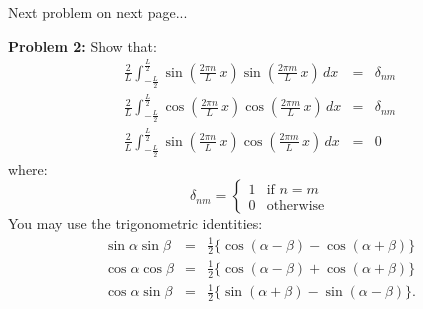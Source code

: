 \documentclass[12pt]{article}
\begin{document}
\vskip 1cm
\begin{center}
Next problem on next page...
\end{center}

\newpage
\noindent
{\bf Problem 2:}  Show that:
\begin{eqnarray*}
\frac{2}{L} \int_{-\frac{L}{2}}^{\frac{L}{2}} 
\sin\left(\frac{2\pi n}{L} \, x \right) \sin\left(\frac{2\pi m}{L} \, x \right) \, dx &=& \delta_{nm} \label{eqn:trigortha} \\
 \frac{2}{L} \int_{-\frac{L}{2}}^{\frac{L}{2}} 
\cos\left(\frac{2\pi n}{L} \, x \right) \cos\left(\frac{2\pi m}{L} \, x \right) \, dx &=& \delta_{nm} \label{eqn:trigorthb}\\
\frac{2}{L} \int_{-\frac{L}{2}}^{\frac{L}{2}} 
\sin\left(\frac{2\pi n}{L} \, x \right) \cos\left(\frac{2\pi m}{L} \, x \right) \, dx &=& 0 \label{eqn:trigorthc}
\end{eqnarray*}
where:
\begin{displaymath}
\delta_{nm} =  
\left\{
        \begin{array}{ll}
                1  & \mbox{if } n=m \\
                0 & \mbox{otherwise}
        \end{array}
\right.
\end{displaymath}
You may use the trigonometric identities:
\begin{eqnarray*}
\sin \alpha \sin \beta &=& \frac{1}{2} \{\cos(\alpha - \beta) - \cos(\alpha + \beta)\}\\
\cos \alpha \cos \beta &=& \frac{1}{2} \{\cos(\alpha - \beta) + \cos(\alpha + \beta)\}\\
\cos \alpha \sin \beta &=& \frac{1}{2} \{\sin(\alpha + \beta) - \sin(\alpha - \beta)\}.\\
\end{eqnarray*}
\end{document}
